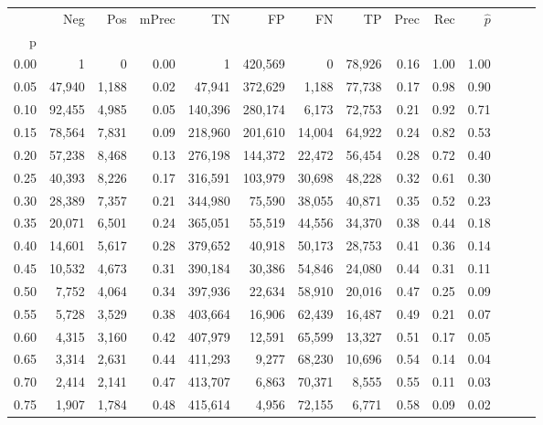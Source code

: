 \begin{tabular}{rrrrrrrrrrrrrr}
\toprule
{} &     Neg &    Pos & mPrec &       TN &       FP &      FN &      TP &  Prec &   Rec & $\hat{p}$ \\
p    &         &        &       &          &          &         &         &       &       &           \\
\midrule
0.00 &       1 &      0 &  0.00 &        1 &  420,569 &       0 &  78,926 &  0.16 &  1.00 &      1.00 \\
0.05 &  47,940 &  1,188 &  0.02 &   47,941 &  372,629 &   1,188 &  77,738 &  0.17 &  0.98 &      0.90 \\
0.10 &  92,455 &  4,985 &  0.05 &  140,396 &  280,174 &   6,173 &  72,753 &  0.21 &  0.92 &      0.71 \\
0.15 &  78,564 &  7,831 &  0.09 &  218,960 &  201,610 &  14,004 &  64,922 &  0.24 &  0.82 &      0.53 \\
0.20 &  57,238 &  8,468 &  0.13 &  276,198 &  144,372 &  22,472 &  56,454 &  0.28 &  0.72 &      0.40 \\
0.25 &  40,393 &  8,226 &  0.17 &  316,591 &  103,979 &  30,698 &  48,228 &  0.32 &  0.61 &      0.30 \\
0.30 &  28,389 &  7,357 &  0.21 &  344,980 &   75,590 &  38,055 &  40,871 &  0.35 &  0.52 &      0.23 \\
0.35 &  20,071 &  6,501 &  0.24 &  365,051 &   55,519 &  44,556 &  34,370 &  0.38 &  0.44 &      0.18 \\
0.40 &  14,601 &  5,617 &  0.28 &  379,652 &   40,918 &  50,173 &  28,753 &  0.41 &  0.36 &      0.14 \\
0.45 &  10,532 &  4,673 &  0.31 &  390,184 &   30,386 &  54,846 &  24,080 &  0.44 &  0.31 &      0.11 \\
0.50 &   7,752 &  4,064 &  0.34 &  397,936 &   22,634 &  58,910 &  20,016 &  0.47 &  0.25 &      0.09 \\
0.55 &   5,728 &  3,529 &  0.38 &  403,664 &   16,906 &  62,439 &  16,487 &  0.49 &  0.21 &      0.07 \\
0.60 &   4,315 &  3,160 &  0.42 &  407,979 &   12,591 &  65,599 &  13,327 &  0.51 &  0.17 &      0.05 \\
0.65 &   3,314 &  2,631 &  0.44 &  411,293 &    9,277 &  68,230 &  10,696 &  0.54 &  0.14 &      0.04 \\
0.70 &   2,414 &  2,141 &  0.47 &  413,707 &    6,863 &  70,371 &   8,555 &  0.55 &  0.11 &      0.03 \\
0.75 &   1,907 &  1,784 &  0.48 &  415,614 &    4,956 &  72,155 &   6,771 &  0.58 &  0.09 &      0.02 \\

\end{tabular}
